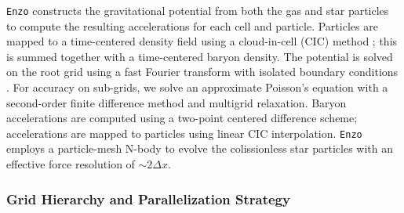 \documentclass[11pt]{article}
\begin{document}

\texttt{Enzo} constructs the gravitational potential from both the gas and star particles to compute the resulting accelerations for each cell and particle. Particles are mapped to a time-centered density field using a cloud-in-cell (CIC) method \citep{HockneyEastwood1988}; this is summed together with a time-centered baryon density. The potential is solved on the root grid using a fast Fourier transform with isolated boundary conditions \citep{James1977}. For accuracy on sub-grids, we solve an approximate Poisson's equation with a second-order finite difference method and multigrid relaxation. Baryon accelerations are computed using a two-point centered difference scheme; accelerations are mapped to particles using linear CIC interpolation. \texttt{Enzo} employs a particle-mesh N-body to evolve the colissionless star particles with an effective force resolution of $\sim 2 \Delta x$.

\subsubsection{Grid Hierarchy and Parallelization Strategy}

\end{document}
